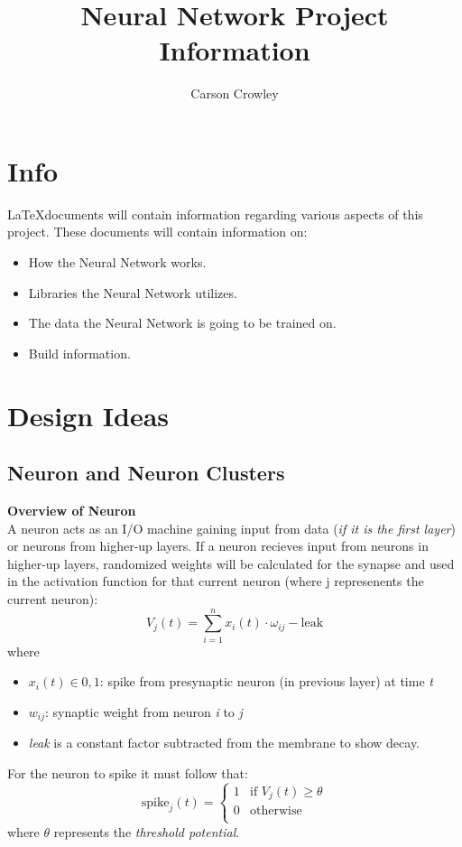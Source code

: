 \documentclass{article}
\title{Neural Network Project Information}
\author{Carson Crowley}
\begin{document}
 
\maketitle

\section*{Info}
\LaTeX documents will contain information regarding various aspects of this project. These documents will contain information on: 
\begin{itemize}
	\item How the Neural Network works. 
	\item Libraries the Neural Network utilizes. 
	\item The data the Neural Network is going to be trained on. 
	\item Build information. 
\end{itemize} 

\section*{Design Ideas}
\subsection*{Neuron and Neuron Clusters}
\textbf{Overview of Neuron}\\[0.5em]
A neuron acts as an I/O machine gaining input from data (\textit{if it is the first layer}) or neurons from higher-up layers. If a neuron recieves input from neurons in higher-up layers, randomized weights will be calculated for the synapse and used in the activation function for that current neuron (where j represenents the current neuron): 
\[V_j(t) = \sum_{i=1}^{n}x_i(t)\cdot \omega_{ij} - \text{leak}\]
where
\begin{itemize} 
	  \item	\(x_i(t) \in {0,1}\): spike from presynaptic neuron (in previous layer) at time \textit{t}
	  \item \(w_{ij}\): synaptic weight from neuron \textit{i} to \textit{j} 
\item \textit{leak} is a constant factor subtracted from the membrane to show decay.
\end{itemize}
		   
For the neuron to spike it must follow that: \\
\begin{equation} 
	\text{spike}_j(t) = 
	\begin{cases}
		1 & \text{if } V_j(t) \geq \theta \\ 
		0 & \text{otherwise} \\  
	\end{cases} 
\end{equation}
where \(\theta\) represents the \textit{threshold potential}. \\[0.5em] 
\end{document}
